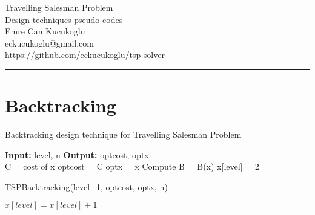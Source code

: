 \documentclass[12pt]{article}
\makeatletter
\newcommand{\myheader}[4]
{\vspace*{-0.5in}
\noindent
{#1} \hfill {#3}

\noindent
{#2} \hfill {#4}

\noindent
\rule[8pt]{\textwidth}{1pt}

\vspace{1ex} 
}  %
\newcommand{\myalgsheader}[0]
{\myheader{}
{Travelling Salesman Problem \\ Design techniques pseudo codes \\ Emre Can Kucukoglu \\ eckucukoglu@gmail.com \\ https://github.com/eckucukoglu/tsp-solver} {}{}}
\makeatother
\begin{document}
\myalgsheader
{}
\pagestyle{plain}

\section{Backtracking}

\begin{algorithm}
  \caption{Backtracking design technique for Travelling Salesman Problem}
  \begin{algorithmic}[1]
  
    \State \textbf{Input:} level, n
    \State \textbf{Output:} optcost, optx 
    \\
    
        \State C = cost of x
            \State optcost = C
            \State optx = x
        \EndIf
    \Else
        \State Compute B = B(x)
        \State x[level] = 2
            
                \State TSPBacktracking(level+1, optcost, optx, n)
            \EndIf
            
            \State $x[level] = x[level] + 1$
        \EndWhile
    \EndIf

    \EndProcedure
  \end{algorithmic}
\end{algorithm}

\newpage
\end{document}
